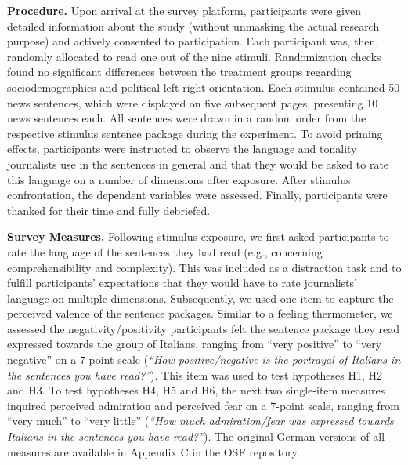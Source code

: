 \textbf{Procedure.} Upon arrival at the survey platform, participants were given detailed information about the study (without unmasking the actual research purpose) and actively consented to participation. Each participant was, then, randomly allocated to read one out of the nine stimuli. Randomization checks found no significant differences between the treatment groups regarding sociodemographics and political left-right orientation. Each stimulus contained 50 news sentences, which were displayed on five subsequent pages, presenting 10 news sentences each. All sentences were drawn in a random order from the respective stimulus sentence package during the experiment. To avoid priming effects, participants were instructed to observe the language and tonality journalists use in the sentences in general and that they would be asked to rate this language on a number of dimensions after exposure. After stimulus confrontation, the dependent variables were assessed. Finally, participants were thanked for their time and fully debriefed.

\textbf{Survey Measures.} Following stimulus exposure, we first asked participants to rate the language of the sentences they had read (e.g., concerning comprehensibility and complexity). This was included as a distraction task and to fulfill participants' expectations that they would have to rate journalists' language on multiple dimensions. Subsequently, we used one item to capture the perceived valence of the sentence packages. Similar to a feeling thermometer, we assessed the negativity/positivity participants felt the sentence package they read expressed towards the group of Italians, ranging from ``very positive'' to ``very negative'' on a 7-point scale (\textit{``How positive/negative is the portrayal of Italians in the sentences you have read?''}). This item was used to test hypotheses H1, H2 and H3. To test hypotheses H4, H5 and H6, the next two single-item measures inquired perceived admiration and perceived fear on a 7-point scale, ranging from ``very much'' to ``very little'' (\textit{``How much admiration/fear was expressed towards Italians in the sentences you have read?''}). The original German versions of all measures are available in Appendix C in the OSF repository.

